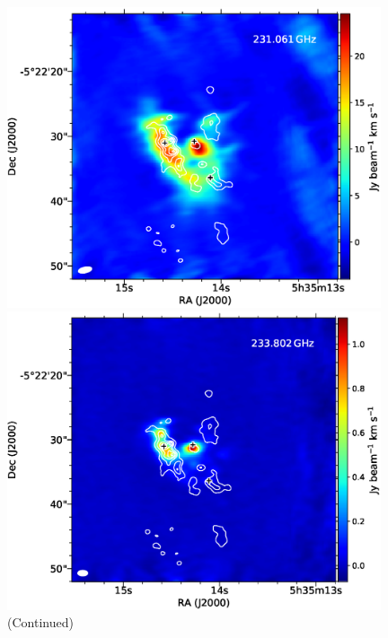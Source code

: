 \begin{figure}[H]
\begin{center}
\begin{minipage}{0.98\textwidth} 
\begin{center}
\begin{minipage}{0.48\textwidth}
\begin{center}
\includegraphics[width=0.98\textwidth]{OrionKL/mom0/231.061mom0_3-7.eps}
\end{center}
\end{minipage}
\begin{minipage}{0.48\textwidth}
\begin{center}
\includegraphics[width=0.98\textwidth]{OrionKL/mom0/233.802mom0_3-7.eps}
\end{center}
\end{minipage}
\end{center}
\end{minipage}

\caption{(Continued)}
\end{center}
\end{figure}

